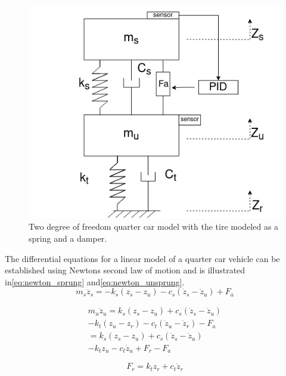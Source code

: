 \begin{figure}
    \centering
    \includegraphics[width=\columnwidth]{images/qcm.png}
    \caption{Two degree of freedom quarter car model with the tire modeled as a spring and a damper.}
    \label{fig:qcm}
\end{figure}

The differential equations for a linear model of a quarter car vehicle can be established using Newtons second law of motion and is illustrated in\:\eqref{eq:newton_sprung} and\:\eqref{eq:newton_unsprung}.
\begin{dmath}
    \label{eq:newton_sprung}
    m_s\ddot{z}_s = -k_s(z_s - z_u) - c_s(\dot{z}_s - \dot{z}_u) + F_a
\end{dmath}

\begin{equation}
    \begin{split}
        \label{eq:newton_unsprung}
        m_u\ddot{z}_u = k_s(z_s - z_u) + c_s(\dot{z}_s - \dot{z}_u) \\
        - k_t(z_u - z_r) - c_t(\dot{z}_u - \dot{z}_r) - F_a \\
        = k_s(z_s - z_u) + c_s(\dot{z}_s - \dot{z}_u) \\
        -k_t z_u - c_t\dot{z}_u + F_r - F_a
    \end{split}
\end{equation}

\begin{dmath}
    \label{eq:f_r}
    F_r = k_t z_r + c_t\dot{z}_r
\end{dmath}

